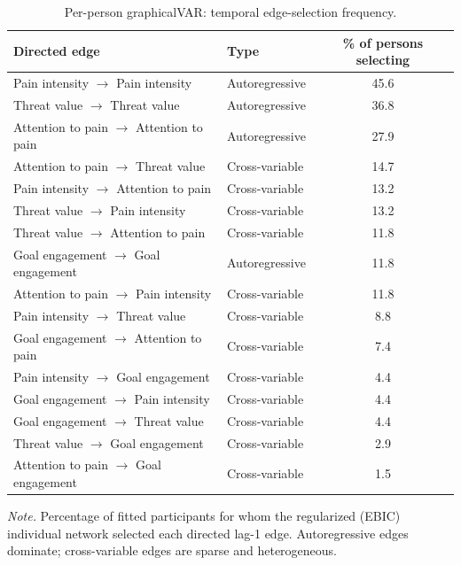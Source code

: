 \begin{table}[H]
\raggedright
\caption{Per-person graphicalVAR: temporal edge-selection frequency.}
\label{tab:sup-graphicalvar}
\scriptsize
\begingroup
\setlength{\tabcolsep}{4pt}
\renewcommand{\arraystretch}{1.08}
\noindent
\begin{tabular*}{\textwidth}{@{\extracolsep{\fill}}llc@{}}
\toprule
Directed edge & Type & \% of persons selecting \\
\midrule
Pain intensity $\rightarrow$ Pain intensity & Autoregressive & 45.6 \\
Threat value $\rightarrow$ Threat value & Autoregressive & 36.8 \\
Attention to pain $\rightarrow$ Attention to pain & Autoregressive & 27.9 \\
Attention to pain $\rightarrow$ Threat value & Cross-variable & 14.7 \\
Pain intensity $\rightarrow$ Attention to pain & Cross-variable & 13.2 \\
Threat value $\rightarrow$ Pain intensity & Cross-variable & 13.2 \\
Threat value $\rightarrow$ Attention to pain & Cross-variable & 11.8 \\
Goal engagement $\rightarrow$ Goal engagement & Autoregressive & 11.8 \\
Attention to pain $\rightarrow$ Pain intensity & Cross-variable & 11.8 \\
Pain intensity $\rightarrow$ Threat value & Cross-variable & 8.8 \\
Goal engagement $\rightarrow$ Attention to pain & Cross-variable & 7.4 \\
Pain intensity $\rightarrow$ Goal engagement & Cross-variable & 4.4 \\
Goal engagement $\rightarrow$ Pain intensity & Cross-variable & 4.4 \\
Goal engagement $\rightarrow$ Threat value & Cross-variable & 4.4 \\
Threat value $\rightarrow$ Goal engagement & Cross-variable & 2.9 \\
Attention to pain $\rightarrow$ Goal engagement & Cross-variable & 1.5 \\
\bottomrule
\end{tabular*}
\par\vspace{3pt}\noindent\parbox{\textwidth}{\scriptsize\textit{Note.} Percentage of fitted participants for whom the regularized (EBIC) individual network selected each directed lag-1 edge. Autoregressive edges dominate; cross-variable edges are sparse and heterogeneous.}
\endgroup
\end{table}
